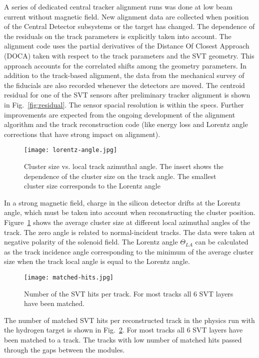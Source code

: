 A series of dedicated central tracker alignment runs was done at low beam current without magnetic field. New alignment data are collected when position of the Central Detector subsystems or the target has changed. The dependence of the residuals on the track parameters is explicitly taken into account. The alignment code uses the partial derivatives of the Distance Of Closest Approach (DOCA) taken with respect to the track parameters and the SVT geometry. This approach accounts for the correlated shifts among the geometry parameters. In addition to the track-based alignment, the data from the mechanical survey of the fiducials are also recorded whenever the detectors are moved. The centroid residual for one of the SVT sensors after preliminary tracker alignment is shown in Fig.~\ref{fig:residual}. The sensor spacial resolution is within the specs. Further improvements are expected from the ongoing development of the alignment algorithm and the track reconstruction code (like energy loss and Lorentz angle corrections that have strong impact on alignment).

\begin{figure}[hbt] 
\centering 
\texttt{[image: lorentz-angle.jpg]}
\caption{Cluster size vs. local track azimuthal angle. The insert shows the dependence of the cluster size on the track angle. The smallest cluster size corresponds to the Lorentz angle}
\label{fig:lorentz-angle}
\end{figure}

In a strong magnetic field, charge in the silicon detector drifts at the Lorentz angle, which must be taken into account when reconstructing the cluster position. Figure~\ref{fig:lorentz-angle} shows the average cluster size at different local azimuthal angles of the track. The zero angle is related to normal-incident tracks. The data were taken at negative polarity of the solenoid field. The Lorentz angle $\Theta_{LA}$ can be calculated as the track incidence angle corresponding to the minimum of the average cluster size when the track local angle is equal to the Lorentz angle.

\begin{figure}[hbt] 
\centering 
\texttt{[image: matched-hits.jpg]}
\caption{Number of the SVT hits per track. For most tracks all 6 SVT layers have been matched.}
\label{fig:matched-hits}
\end{figure}

The number of matched SVT hits per reconstructed track in the physics run with the hydrogen target is shown in Fig.~\ref{fig:matched-hits}. For most tracks all 6 SVT layers have been matched to a track. The tracks with low number of matched hits passed through the gaps between the modules.


